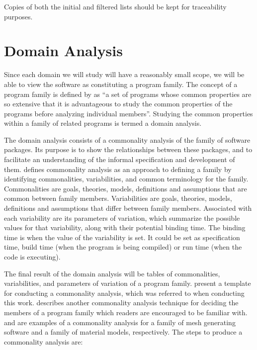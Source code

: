 \documentclass[letterpaper,cleveref]{lipics-v2019}
\theoremstyle{definition}
\begin{document}
Copies of both the initial and filtered lists should be kept for traceability purposes.

\section{Domain Analysis} \label{SecDomainAnalysis}

Since each domain we will study will have a reasonably small scope, we
will be able to view the software as constituting a program
family.  The concept of a program family is defined by \citet{parnas1976design}
as ``a set of programs whose common properties are so extensive that it is
advantageous to study the common properties of the programs before analyzing
individual members''.  Studying the common properties within a family of related
programs is termed a domain analysis.

The domain analysis consists of a commonality analysis of
the family of software packages. Its purpose is to show the relationships
between these packages, and to facilitate an understanding of the informal
specification and development of them. \cite{weiss1997defining} defines
commonality analysis as an approach to defining a family by identifying
commonalities, variabilities, and common terminology for the
family. Commonalities are goals, theories, models, definitions and assumptions
that are common between family members.  Variabilities are goals, theories,
models, definitions and assumptions that differ between family
members. Associated with each variability are its parameters of variation, which
summarize the possible values for that variability, along with their potential
binding time.  The binding time is when the value of the variability is set.  It
could be set as specification time, build time (when the program is being
compiled) or run time (when the code is executing).

The final result of the domain analysis will be
tables of commonalities, variabilities, and parameters of variation of a program
family.   \cite{smith2008commonality} present a template for conducting a
commonality analysis, which was referred to when conducting this
work. \cite{weiss1998commonality} describes another commonality analysis
technique for deciding the members of a program family which readers are
encouraged to be familiar with. \cite{SmithAndChen2004} and
\cite{SmithMcCutchanAndCarette2017} are examples of a commonality analysis for a
family of mesh generating software and a family of material models,
respectively. The steps to produce a commonality analysis are:
\end{document}
